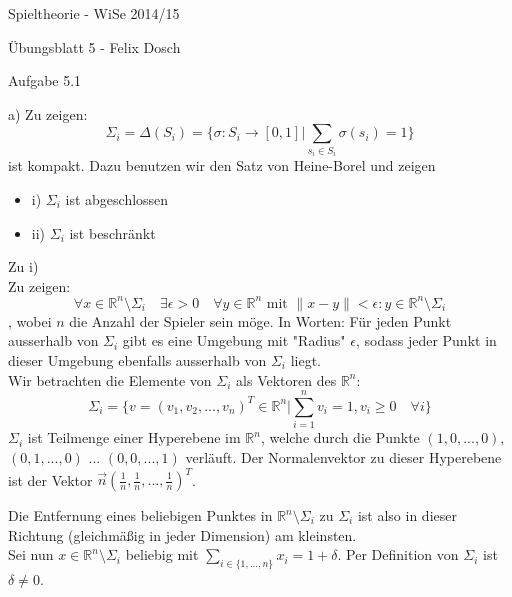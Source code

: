 \documentclass{scrartcl}
\begin{document}
\begin{LARGE}
Spieltheorie - WiSe 2014/15
\end{LARGE}

\begin{Large}
Übungsblatt 5 - Felix Dosch\\[1.0cm]
\end{Large}

\begin{Large}
Aufgabe 5.1\\[0.0cm]
\end{Large}

a) Zu zeigen:
\[
\Sigma_i = \Delta(S_i) = \{\sigma : S_i \longrightarrow [0,1] | \sum_{s_i \in S_i} \sigma(s_i) = 1\}
\]
ist kompakt. Dazu benutzen wir den Satz von Heine-Borel und zeigen
\begin{itemize}
\item{i) $\Sigma_i$ ist abgeschlossen}
\item{ii) $\Sigma_i$ ist beschränkt}
\end{itemize}

Zu i) \\

Zu zeigen: 
\[
\forall x \in \mathbb{R}^n \setminus \Sigma_i \quad  \exists \epsilon > 0 \quad \forall y 
\in \mathbb{R}^n \text{ mit } \|x-y\| < \epsilon : y \in \mathbb{R}^n \setminus \Sigma_i
\], wobei $n$ die Anzahl der Spieler sein möge.
In Worten: Für jeden Punkt ausserhalb von $\Sigma_i$ gibt es eine Umgebung mit "Radius" $\epsilon$,
sodass jeder Punkt in dieser Umgebung ebenfalls ausserhalb von $\Sigma_i$ liegt. \\

Wir betrachten die Elemente von $\Sigma_i$ als Vektoren des $\mathbb{R}^n$:
\[
\Sigma_i =  \{v = (v_1, v_2, ..., v_n)^T \in \mathbb{R}^n | \sum_{i = 1}^n v_i = 1, v_i \geq 0 \quad 
\forall i\}
\]
 $\Sigma_i$ ist Teilmenge
einer Hyperebene im $\mathbb{R}^n$, welche durch die Punkte $(1, 0, ..., 0)$, $(0, 1, ..., 0)$ ...
$(0, 0, ..., 1)$ verläuft. Der Normalenvektor zu dieser Hyperebene ist der Vektor $\overrightarrow{n}
(\frac{1}{n}, \frac{1}{n}, ..., \frac{1}{n})^T$.

Die Entfernung eines beliebigen Punktes in $\mathbb{R}^n \setminus \Sigma_i$ zu $\Sigma_i$ ist also
in dieser Richtung (gleichmäßig in jeder Dimension) am kleinsten. \\

Sei nun $x \in \mathbb{R}^n \setminus \Sigma_i$ beliebig mit $\sum_{i \in \{1, ..., n\}} x_i = 1 + 
\delta$. Per Definition von $\Sigma_i$ ist $\delta \neq 0$.
\end{document}
